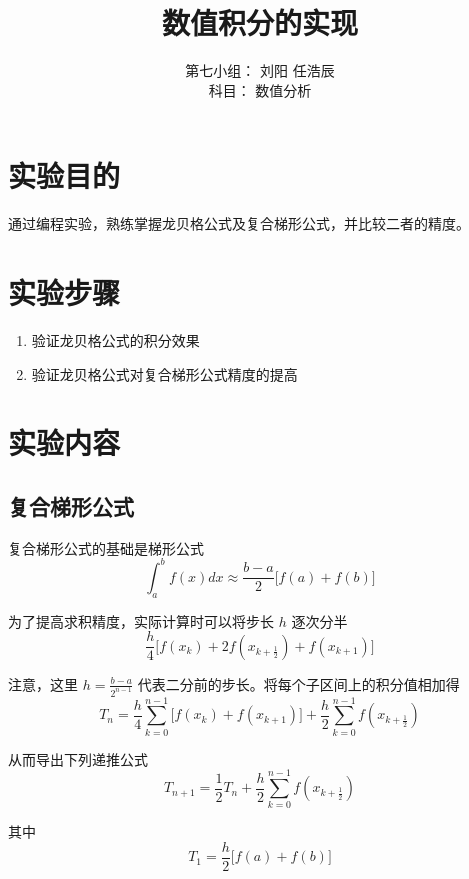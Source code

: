 \documentclass[lang=cn,11pt,a4paper]{elegantpaper}
\title{数值积分的实现}
\author{第七小组： 刘阳 \quad 任浩辰 \\ 科目： 数值分析}
\date{\zhtoday}
\begin{document}
\maketitle

\section{实验目的}
通过编程实验，熟练掌握龙贝格公式及复合梯形公式，并比较二者的精度。

\section{实验步骤}
\begin{enumerate}
  \item 验证龙贝格公式的积分效果
  \item 验证龙贝格公式对复合梯形公式精度的提高
\end{enumerate}

\section{实验内容}
\subsection{复合梯形公式}
复合梯形公式的基础是梯形公式
\begin{equation}
  \int_{a}^{b} f(x)dx \approx \frac{b - a}{2} \lbrack f(a) + f(b) \rbrack
\end{equation}

为了提高求积精度，实际计算时可以将步长 $h$ 逐次分半
\begin{equation}
  \frac{h}{4} \lbrack f(x_k) + 2f(x_{k + \frac{1}{2}}) + f(x_{k + 1}) \rbrack
\end{equation}

注意，这里 $h = \frac{b - a}{2^{n-1}}$ 代表二分前的步长。将每个子区间上的积分值相加得
\begin{equation}
  T_n = \frac{h}{4} \sum_{k=0}^{n-1} \lbrack f(x_k) + f(x_{k+1}) \rbrack + \frac{h}{2} \sum_{k=0}^{n-1}f(x_{k+\frac{1}{2}})
\end{equation}

从而导出下列递推公式
\begin{equation} \label{T}
  T_{n+1} = \frac{1}{2} T_n + \frac{h}{2} \sum_{k=0}^{n-1} f(x_{k+\frac{1}{2}})
\end{equation}

其中
\begin{equation}
  T_1 = \frac{h}{2} \lbrack f(a) + f(b) \rbrack
\end{equation}
\end{document}
